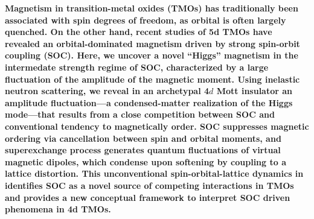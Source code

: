 \maketitle
\noindent
{\bf 
Magnetism in transition-metal oxides (TMOs) has traditionally been associated with spin degrees of freedom, as orbital is often largely quenched. On the other hand, recent studies of 5d TMOs have revealed an orbital-dominated magnetism driven by strong spin-orbit coupling (SOC). Here, we uncover a novel ``Higgs'' magnetism in the intermedate strength regime of SOC, characterized by a large fluctuation of the amplitude of the magnetic moment. Using inelastic neutron scattering, we reveal in an archetypal 4$d$ Mott insulator \CRO an amplitude fluctuation---a condensed-matter realization of the Higgs mode---that results from a close competition between SOC and conventional tendency to magnetically order. SOC suppresses magnetic ordering via cancellation between spin and orbital moments, and superexchange process generates quantum fluctuations of virtual magnetic dipoles, which condense upon softening by coupling to a lattice distortion. This unconventional spin-orbital-lattice dynamics in \CRO identifies SOC as a novel source of competing interactions in TMOs and provides a new conceptual framework to interpret SOC driven phenomena in 4d TMOs.
}
  
  